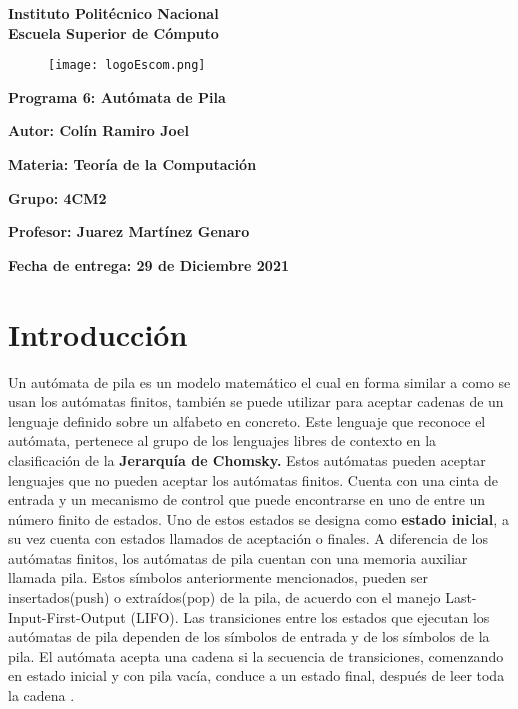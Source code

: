 \documentclass{article}
\begin{document}
	\begin{titlepage}
		\begin{center}
			{\huge\textbf{Instituto Politécnico Nacional}}\\
			\vspace{7mm}
			{\huge\textbf{Escuela Superior de Cómputo}}\\			
			\begin{figure}[h]
				\centering
				\texttt{[image: logoEscom.png]}
			\end{figure}	
			\vspace{1cm}
			{\huge\textbf{Programa 6: Autómata de Pila}}
			\par\vspace{2cm}
			\large\textbf{Autor: Colín Ramiro Joel}
			\par\vspace{1cm}
			{\large\textbf{Materia: Teoría de la Computación}}
			\par\vspace{1cm}
			{\large\textbf{Grupo: 4CM2}}
			\par\vspace{1cm}
			{\large\textbf{Profesor: Juarez Martínez Genaro}}
			\par\vspace{1cm}
			{\large\textbf{Fecha de entrega: {\huge{29 de Diciembre 2021}}}}
			\par\vspace{3cm}
		\end{center}
	\end{titlepage}
	\section*{Introducción}
	Un autómata de pila es un modelo matemático el cual en forma similar a como se usan los autómatas finitos, también se puede utilizar para aceptar cadenas de un lenguaje definido sobre un alfabeto en concreto.
	Este lenguaje que reconoce el autómata, pertenece al grupo de los lenguajes libres de contexto en la clasificación de la \textbf{Jerarquía de Chomsky.}
	Estos autómatas pueden aceptar lenguajes que no pueden aceptar los autómatas finitos. Cuenta con una cinta de entrada y un mecanismo de control que puede encontrarse en uno de entre un número finito de estados. Uno de estos estados se designa como
	\textbf{estado inicial}, a su vez cuenta con estados llamados de aceptación o finales. 
	A diferencia de los	autómatas finitos, los autómatas de pila cuentan con una memoria auxiliar llamada pila. Estos símbolos anteriormente mencionados, pueden ser insertados(push) o extraídos(pop) de la pila, de acuerdo con el manejo Last-Input-First-Output (LIFO).
	Las transiciones entre los estados que ejecutan los autómatas de pila dependen de los símbolos de entrada y de los símbolos de la pila. El autómata acepta una cadena  si la secuencia de transiciones,
	comenzando en estado inicial y con pila vacía, conduce a un estado final, después de leer toda la	cadena . 
\end{document}
